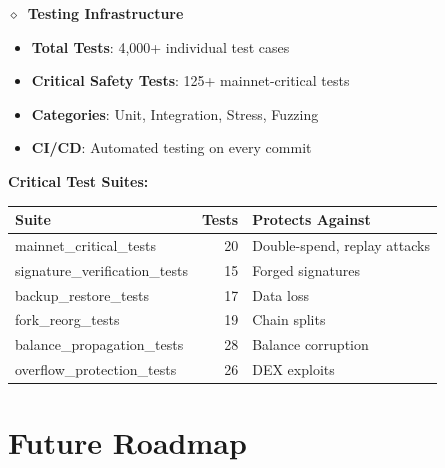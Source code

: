 \documentclass[12pt,a4paper]{article}
\newcommand{\faVial}{$\diamond$}
\begin{document}
\begin{statbox}
\textbf{\faVial\ Testing Infrastructure}

\begin{itemize}
    \item \textbf{Total Tests}: 4,000+ individual test cases
    \item \textbf{Critical Safety Tests}: 125+ mainnet-critical tests
    \item \textbf{Categories}: Unit, Integration, Stress, Fuzzing
    \item \textbf{CI/CD}: Automated testing on every commit
\end{itemize}

\vspace{10pt}
\textbf{Critical Test Suites:}
\begin{center}
\begin{tabular}{@{}lrl@{}}
\toprule
\textbf{Suite} & \textbf{Tests} & \textbf{Protects Against} \\
\midrule
mainnet\_critical\_tests & 20 & Double-spend, replay attacks \\
signature\_verification\_tests & 15 & Forged signatures \\
backup\_restore\_tests & 17 & Data loss \\
fork\_reorg\_tests & 19 & Chain splits \\
balance\_propagation\_tests & 28 & Balance corruption \\
overflow\_protection\_tests & 26 & DEX exploits \\
\bottomrule
\end{tabular}
\end{center}
\end{statbox}

\section{Future Roadmap}
\end{document}
